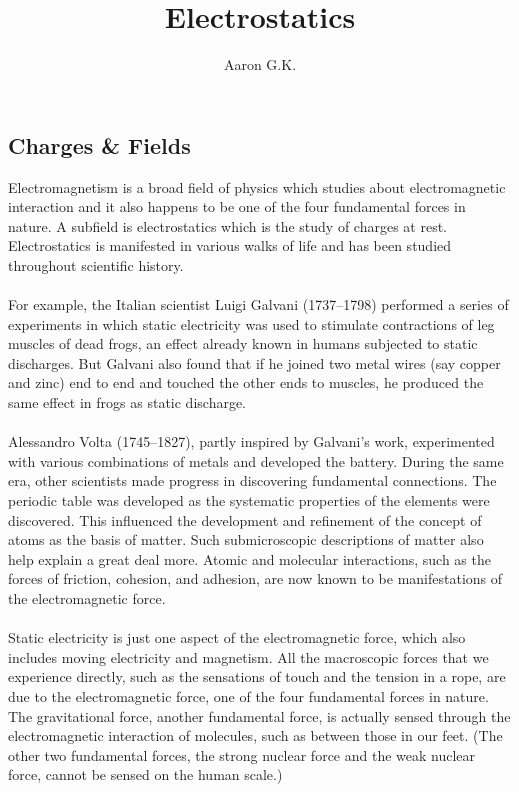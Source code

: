 \documentclass[9pt]{exam}
\title{Electrostatics}
\author{Aaron G.K.}
\begin{document}
	\maketitle
	\begin{center}
		\section*{Charges \& Fields}	
	\end{center}
	Electromagnetism is a broad field of physics which studies about electromagnetic interaction and it also happens to be one of the four fundamental forces in nature. A subfield is electrostatics which is the study of charges at rest. Electrostatics is manifested in various walks of life and has been studied throughout scientific history. \\ \\ For example, the Italian scientist Luigi Galvani (1737–1798) performed a series of experiments in which static electricity was used to stimulate contractions of leg muscles of dead frogs, an effect already known in humans subjected to static discharges. But Galvani also found that if he joined two metal wires (say copper and zinc) end to end and touched the other ends to muscles, he produced the same effect in frogs as static discharge. \\ \\ Alessandro Volta (1745–1827), partly inspired by Galvani’s work, experimented with various combinations of metals and developed the battery. During the same era, other scientists made progress in discovering fundamental connections. The periodic table was developed as the systematic properties of the elements were discovered. This influenced the development and refinement of the concept of atoms as the basis of matter. Such submicroscopic descriptions of matter also help explain a great deal more. Atomic and molecular interactions, such as the forces of friction, cohesion, and adhesion, are now known to be manifestations of the electromagnetic force. \\ \\ Static electricity is just one aspect of the electromagnetic force, which also includes moving electricity and magnetism. 	All the macroscopic forces that we experience directly, such as the sensations of touch and the tension in a rope, are due to the electromagnetic force, one of the four fundamental forces in nature. The gravitational force, another fundamental force, is actually sensed through the electromagnetic interaction of molecules, such as between those in our feet. (The other two fundamental forces, the strong nuclear force and the weak nuclear force, cannot be sensed on the human scale.)\\
\end{document}
